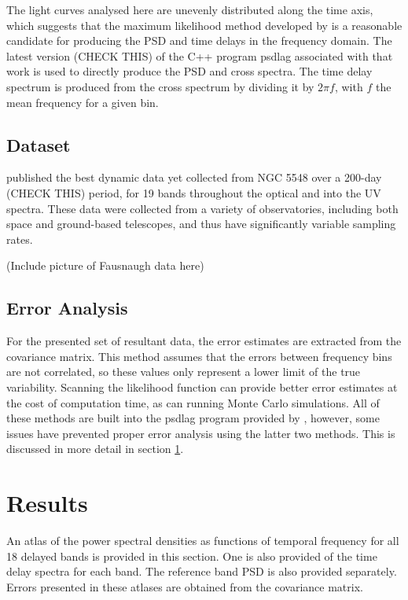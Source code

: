 \documentclass[a4paper,fleqn,usenatbib]{article}
\begin{document}
The light curves analysed here are unevenly distributed along the time axis,
which suggests that the maximum likelihood method developed by
\cite{2013ApJ...777...24Z} is a reasonable candidate for producing the PSD and
time delays in the frequency domain. The latest version (CHECK THIS) of the
C++ program psdlag associated with that work is used to directly produce the
PSD and cross spectra. The time delay spectrum is produced from the cross
spectrum by dividing it by $2 \pi f$, with $f$ the mean frequency for a given
bin.

	\subsection{Dataset}
	\cite{2016ApJ...821...56F} published the best dynamic data yet collected
	from NGC 5548 over a 200-day (CHECK THIS) period, for 19 bands throughout
	the optical and into the UV spectra. These data were collected from a
	variety of observatories, including both space and ground-based
	telescopes, and thus have significantly variable sampling rates.

	(Include picture of Fausnaugh data here)

	\subsection{Error Analysis}
	For the presented set of resultant data, the error estimates are extracted
	from the covariance matrix. This method assumes that the errors between
	frequency bins are not correlated, so these values only represent a lower
	limit of the true variability. Scanning the likelihood function can
	provide better error estimates at the cost of computation time, as can
	running Monte Carlo simulations. All of these methods are built into the
	psdlag program provided by \cite{2013ApJ...777...24Z}, however, some
	issues have prevented proper error analysis using the latter two methods.
	This is discussed in more detail in section \ref{results}.

\section{Results}
\label{results}

	An atlas of the power spectral densities as functions
	of temporal	frequency for all 18 delayed bands is provided in this section.
	One is also provided of the time delay spectra for each band. The reference
	band PSD is also provided separately. Errors presented in these atlases
	are obtained from the covariance matrix.
\end{document}
